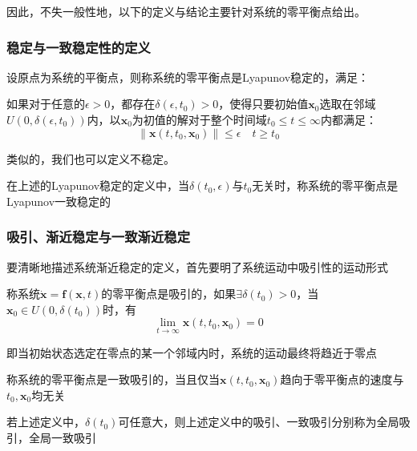 因此，不失一般性地，以下的定义与结论主要针对系统的零平衡点给出。

\subsubsection{稳定与一致稳定性的定义}

\begin{definition}[Lyapunov稳定性]
    设原点为系统的平衡点，则称系统的零平衡点是Lyapunov稳定的，满足：
    
    如果对于任意的$\epsilon > 0$，都存在$\delta(\epsilon,t_0)>0$，使得只要初始值$\bm{x}_0$选取在邻域$U(0,\delta(\epsilon,t_0))$内，以$\bm{x}_0$为初值的解对于整个时间域$t_0 \leq t \leq \infty$内都满足：
    \begin{equation*}
        \left\lVert \bm{x}(t,t_0,\bm{x}_0) \right\rVert \leq \epsilon \quad t \geq t_0
    \end{equation*}

    类似的，我们也可以定义不稳定。
\end{definition}

\begin{definition}[Lyapunov意义下的一致稳定]
    在上述的Lyapunov稳定的定义中，当$\delta(t_0,\epsilon)$与$t_0$无关时，称系统的零平衡点是Lyapunov一致稳定的
\end{definition}

\subsubsection{吸引、渐近稳定与一致渐近稳定}
要清晰地描述系统渐近稳定的定义，首先要明了系统运动中吸引性的运动形式
\begin{definition}[吸引性的定义]
    称系统$\dot{\bm{x}} = \bm{f}(\bm{x},t)$的零平衡点是吸引的，如果$\exists \delta(t_0) > 0 $，当$\bm{x}_0 \in U(0,\delta(t_0))$时，有
    \begin{equation*}
        \lim_{t\to \infty} \bm{x}(t,t_0,\bm{x}_0) = 0
    \end{equation*}

    即当初始状态选定在零点的某一个邻域内时，系统的运动最终将趋近于零点

    称系统的零平衡点是一致吸引的，当且仅当$\bm{x}(t,t_0,\bm{x}_0)$趋向于零平衡点的速度与$t_0,\bm{x}_0$均无关
\end{definition}

\begin{definition}
    若上述定义中，$\delta(t_0)$可任意大，则上述定义中的吸引、一致吸引分别称为全局吸引，全局一致吸引
\end{definition}

